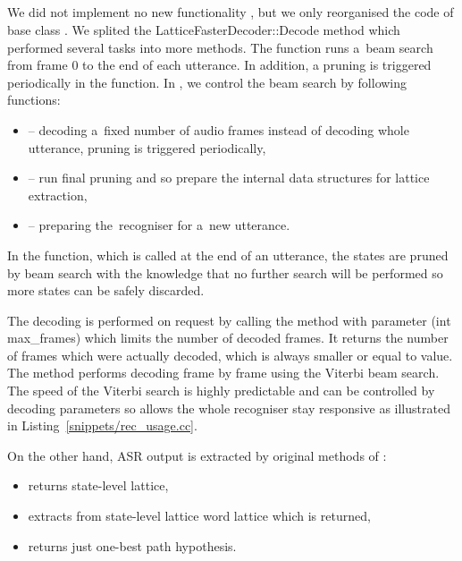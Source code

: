 \subsection{}
\label{sub:dec}
We did not implement no new functionality , but we only reorganised the code of base class .
We splited the LatticeFasterDecoder::Decode method which performed several tasks into more methods.
The  function runs a~beam search from frame 0 to the end of each utterance.
In addition, a pruning is triggered periodically in the function.
In ,  we control the beam search by following functions: 
\begin{itemize}
    \item {} -- decoding a~fixed number of audio frames instead of decoding whole utterance, pruning is triggered periodically,
    \item {} -- run final pruning and so prepare the internal data structures for lattice extraction,
    \item {} -- preparing the~recogniser for a~new utterance.
\end{itemize}

In the  function, which is called at the end of an utterance, the states are pruned by beam search with the knowledge that no further search will be performed so more states can be safely discarded.

The decoding is performed on request by calling the  method with parameter (int max\_frames) which limits the number of decoded frames.
It returns the number of frames which were actually decoded, which is always smaller or equal to  value.
The  method performs decoding frame by frame using the Viterbi beam search.
The speed of the Viterbi search is highly predictable and can be controlled by decoding parameters so  allows the whole recogniser stay responsive as illustrated in Listing~\ref{snippets/rec_usage.cc}. 

On the other hand, \ac{ASR} output is extracted by original methods of :
\begin{itemize}
    \item {} returns state-level lattice,
    \item {} extracts from state-level lattice word lattice which is returned,
    \item {} returns just one-best path hypothesis.
\end{itemize}

